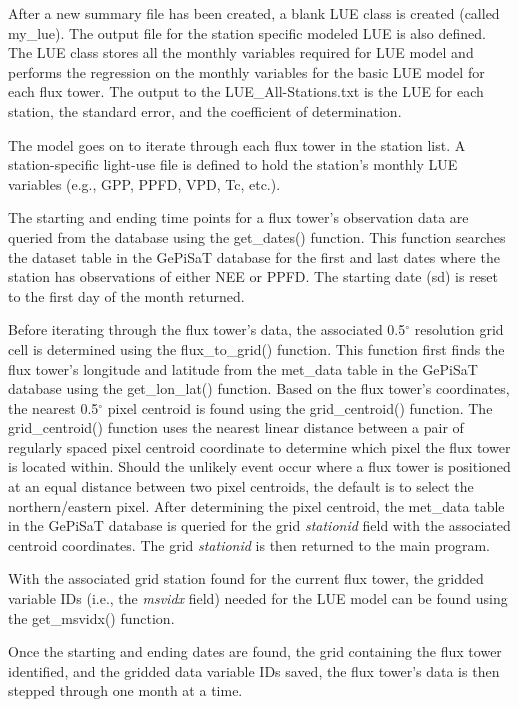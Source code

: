 After a new summary file has been created, a blank LUE class is created (called my\_lue).  
The output file for the station specific modeled LUE is also defined.  
The LUE class stores all the monthly variables required for LUE model and performs the regression on the monthly variables for the basic LUE model for each flux tower.  
The output to the LUE\_All-Stations.txt is the LUE for each station, the standard error, and the coefficient of determination.

The model goes on to iterate through each flux tower in the station list.  
A station-specific light-use file is defined to hold the station's monthly LUE variables (e.g., GPP, PPFD, VPD, Tc, etc.).  

The starting and ending time points for a flux tower's observation data are queried from the database using the get\_dates() function.  
This function searches the data\textunderscore set table in the GePiSaT database for the first and last dates where the station has observations of either NEE or PPFD.  
The starting date (sd) is reset to the first day of the month returned.  

Before iterating through the flux tower's data, the associated 0.5$^{\circ}$ resolution grid cell is determined using the flux\_to\_grid() function. 
This function first finds the flux tower's longitude and latitude from the met\_data table in the GePiSaT database using the get\_lon\_lat() function.  
Based on the flux tower's coordinates, the nearest 0.5$^{\circ}$ pixel centroid is found using the grid\_centroid() function.  
The grid\_centroid() function uses the nearest linear distance between a pair of regularly spaced pixel centroid coordinate to determine which pixel the flux tower is located within. 
Should the unlikely event occur where a flux tower is positioned at an equal distance between two pixel centroids, the default is to select the northern/eastern pixel.  
After determining the pixel centroid, the met\_data table in the GePiSaT database is queried for the grid \textit{stationid} field with the associated centroid coordinates. 
The grid \textit{stationid} is then returned to the main program.

With the associated grid station found for the current flux tower, the gridded variable IDs (i.e., the \textit{msvidx} field) needed for the LUE model can be  found using the get\_msvidx() function. 

Once the starting and ending dates are found, the grid containing the flux tower identified, and the gridded data variable IDs saved, the flux tower's data is then stepped through one month at a time.

